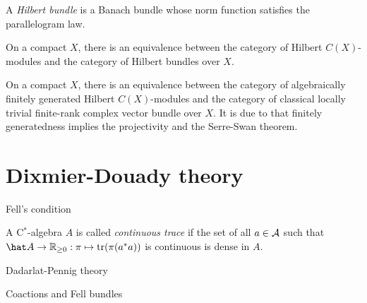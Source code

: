 \documentclass{../../large}
\begin{document}
\begin{prb}
A \emph{Hilbert bundle} is a Banach bundle whose norm function satisfies the parallelogram law.

\begin{parts}
\item On a compact $X$, there is an equivalence between the category of Hilbert $C(X)$-modules and the category of Hilbert bundles over $X$.
\item On a compact $X$, there is an equivalence between the category of algebraically finitely generated Hilbert $C(X)$-modules and the category of classical locally trivial finite-rank complex vector bundle over $X$.
It is due to that finitely generatedness implies the projectivity and the Serre-Swan theorem.
\end{parts}
\end{prb}



\section{Dixmier-Douady theory}


Fell's condition

A C$^*$-algebra $A$ is called \emph{continuous trace} if the set of all $a\in\mathcal{A}$ such that $\hat A\to\R_{\ge0}:\pi\mapsto\tr(\pi(a^*a))$ is continuous is dense in $A$.



Dadarlat-Pennig theory


Coactions and Fell bundles
\end{document}
